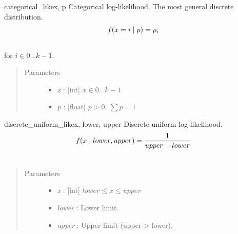 \hypertarget{pymc.distributions.categorical_like}{}\begin{funcdesc}{categorical\_like}{x, p}
Categorical log-likelihood. The most general discrete distribution.
\begin{gather}
\begin{split}f(x=i \mid p) = p_i\end{split}\notag\\\begin{split}\end{split}\notag
\end{gather}
for $i \in 0 \ldots k-1$.
\begin{quote}\begin{description}
\item[Parameters] \leavevmode\begin{itemize}
\item {} 
\emph{x} : {[}int{]} $x \in 0\ldots k-1$

\item {} 
\emph{p} : {[}float{]} $p > 0$, $\sum p = 1$

\end{itemize}

\end{description}\end{quote}
\end{funcdesc}

\hypertarget{pymc.distributions.discrete_uniform_like}{}\begin{funcdesc}{discrete\_uniform\_like}{x, lower, upper}
Discrete uniform log-likelihood.
\begin{gather}
\begin{split}f(x \mid lower, upper) = \frac{1}{upper-lower}\end{split}\notag\\\begin{split}\end{split}\notag
\end{gather}\begin{quote}\begin{description}
\item[Parameters] \leavevmode\begin{itemize}
\item {} 
\emph{x} : {[}int{]} $lower \leq x \leq upper$

\item {} 
\emph{lower} : Lower limit.

\item {} 
\emph{upper} : Upper limit (upper \textgreater{} lower).

\end{itemize}

\end{description}\end{quote}
\end{funcdesc}

